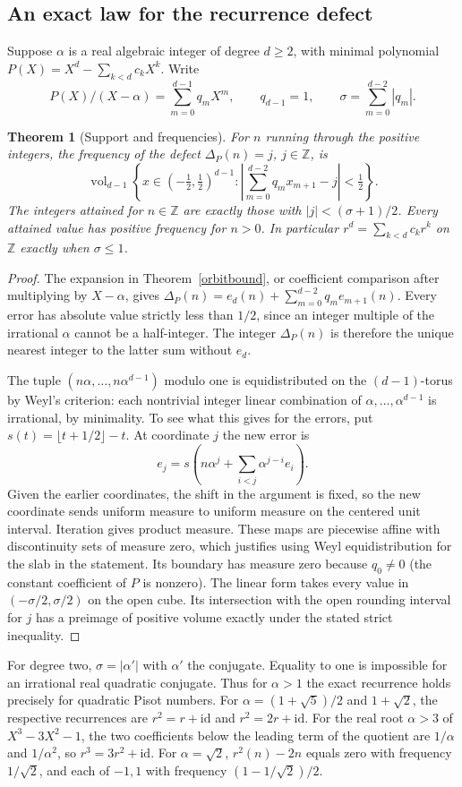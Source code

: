 \documentclass[11pt,letterpaper]{article}
\newtheorem{theorem}{Theorem}[section]
\newcommand{\Z}{\mathbb Z}
\begin{document}
\subsection*{An exact law for the recurrence defect}
Suppose $\alpha$ is a real algebraic integer of degree $d\ge2$, with
minimal polynomial $P(X)=X^d-\sum_{k<d}c_kX^k$. Write
\[
 P(X)/(X-\alpha)=\sum_{m=0}^{d-1}q_mX^m,\qquad q_{d-1}=1,\qquad
 \sigma=\sum_{m=0}^{d-2}|q_m|.
\]
\begin{theorem}[Support and frequencies]\label{defectlaw}
For $n$ running through the positive integers, the frequency of the defect
$\Delta_P(n)=j$, $j\in\Z$, is
\[
 \operatorname{vol}_{d-1}\!\left\{x\in(-\tfrac12,\tfrac12)^{d-1}:
  \left|\sum_{m=0}^{d-2}q_m x_{m+1}-j\right|<\tfrac12\right\}.
\]
The integers attained for $n\in\Z$ are exactly those with
$|j|<(\sigma+1)/2$. Every attained value has positive frequency for
$n>0$. In particular $r^d=\sum_{k<d}c_kr^k$ on $\Z$ exactly when
$\sigma\le1$.
\end{theorem}
\begin{proof}
The expansion in Theorem~\ref{orbitbound}, or coefficient comparison after multiplying
by $X-\alpha$, gives $\Delta_P(n)=e_d(n)+\sum_{m=0}^{d-2}q_m e_{m+1}(n)$.
Every error has absolute value strictly less than $1/2$, since an integer multiple of
the irrational $\alpha$ cannot be a half-integer. The integer $\Delta_P(n)$ is
therefore the unique nearest integer to the latter sum without $e_d$.

The tuple $(n\alpha,\ldots,n\alpha^{d-1})$ modulo one is equidistributed
on the $(d-1)$-torus by Weyl's criterion: each nontrivial integer
linear combination of $\alpha,\ldots,\alpha^{d-1}$ is irrational, by
minimality. To see what this gives for the errors, put $s(t)=\lfloor t+1/2\rfloor-t$.
At coordinate $j$ the new error is
\[
 e_j=s\!\left(n\alpha^j+\sum_{i<j}\alpha^{j-i}e_i\right).
\]
Given the earlier coordinates, the shift in the argument is fixed, so
the new coordinate sends uniform measure to uniform measure on the
centered unit interval. Iteration gives product measure. These maps are
piecewise affine with discontinuity sets of measure zero, which justifies
using Weyl equidistribution for the slab in the statement. Its boundary
has measure zero because $q_0\ne0$ (the constant coefficient of $P$ is
nonzero). The linear form takes every value in $(-\sigma/2,\sigma/2)$
on the open cube. Its intersection with the open rounding interval for $j$
has a preimage of positive volume exactly under the stated strict inequality.
\end{proof}
For degree two, $\sigma=|\alpha'|$ with $\alpha'$ the conjugate.
Equality to one is impossible for an irrational real quadratic conjugate.
Thus for $\alpha>1$ the exact recurrence holds precisely for quadratic Pisot numbers.
For $\alpha=(1+\sqrt5)/2$ and $1+\sqrt2$, the respective recurrences are
$r^2=r+\mathrm{id}$ and $r^2=2r+\mathrm{id}$. For the real root $\alpha>3$ of
$X^3-3X^2-1$, the two coefficients below the leading term of the quotient
are $1/\alpha$ and $1/\alpha^2$, so $r^3=3r^2+\mathrm{id}$.
For $\alpha=\sqrt2$, $r^2(n)-2n$ equals zero with frequency $1/\sqrt2$,
and each of $-1,1$ with frequency $(1-1/\sqrt2)/2$.
\end{document}
